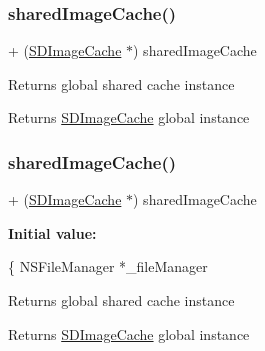 \subsubsection{\texorpdfstring{shared\+Image\+Cache()}{sharedImageCache()}\hspace{0.1cm}{\footnotesize\ttfamily [1/3]}}
{\footnotesize\ttfamily + (\mbox{\hyperlink{interface_s_d_image_cache}{S\+D\+Image\+Cache}} $\ast$) shared\+Image\+Cache \begin{DoxyParamCaption}{ }\end{DoxyParamCaption}}

Returns global shared cache instance

\begin{DoxyReturn}{Returns}
\mbox{\hyperlink{interface_s_d_image_cache}{S\+D\+Image\+Cache}} global instance 
\end{DoxyReturn}
\mbox{\label{interface_s_d_image_cache_a3a622a32640d15bf01e873275ea1e95e}} 
\subsubsection{\texorpdfstring{shared\+Image\+Cache()}{sharedImageCache()}\hspace{0.1cm}{\footnotesize\ttfamily [2/3]}}
{\footnotesize\ttfamily + (\mbox{\hyperlink{interface_s_d_image_cache}{S\+D\+Image\+Cache}} $\ast$) shared\+Image\+Cache \begin{DoxyParamCaption}{ }\end{DoxyParamCaption}}

{\bfseries Initial value\+:}
\begin{DoxyCode}
\{
    NSFileManager *\_fileManager
\end{DoxyCode}
Returns global shared cache instance

\begin{DoxyReturn}{Returns}
\mbox{\hyperlink{interface_s_d_image_cache}{S\+D\+Image\+Cache}} global instance 
\end{DoxyReturn}
\mbox{\label{interface_s_d_image_cache_a3a622a32640d15bf01e873275ea1e95e}} 
